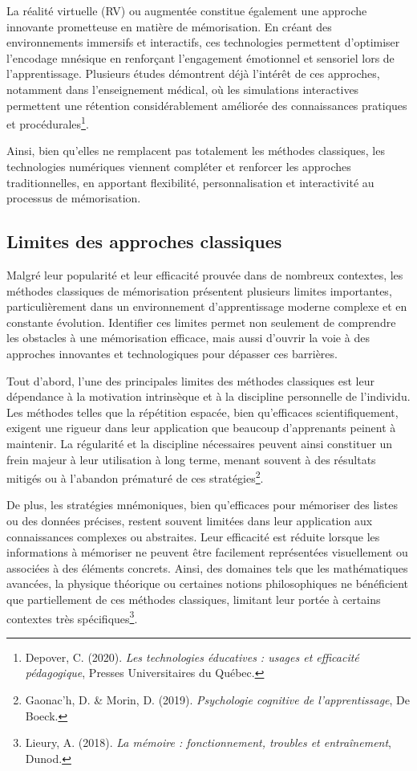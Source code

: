 \documentclass[12pt,a4paper]{report}
\begin{document}
La réalité virtuelle (RV) ou augmentée constitue également une approche innovante prometteuse en matière de mémorisation. En créant des environnements immersifs et interactifs, ces technologies permettent d'optimiser l'encodage mnésique en renforçant l'engagement émotionnel et sensoriel lors de l’apprentissage. Plusieurs études démontrent déjà l’intérêt de ces approches, notamment dans l’enseignement médical, où les simulations interactives permettent une rétention considérablement améliorée des connaissances pratiques et procédurales\footnote{Depover, C. (2020). \textit{Les technologies éducatives : usages et efficacité pédagogique}, Presses Universitaires du Québec.}.

Ainsi, bien qu’elles ne remplacent pas totalement les méthodes classiques, les technologies numériques viennent compléter et renforcer les approches traditionnelles, en apportant flexibilité, personnalisation et interactivité au processus de mémorisation.

\subsection{Limites des approches classiques}

Malgré leur popularité et leur efficacité prouvée dans de nombreux contextes, les méthodes classiques de mémorisation présentent plusieurs limites importantes, particulièrement dans un environnement d’apprentissage moderne complexe et en constante évolution. Identifier ces limites permet non seulement de comprendre les obstacles à une mémorisation efficace, mais aussi d’ouvrir la voie à des approches innovantes et technologiques pour dépasser ces barrières.

Tout d’abord, l’une des principales limites des méthodes classiques est leur dépendance à la motivation intrinsèque et à la discipline personnelle de l’individu. Les méthodes telles que la répétition espacée, bien qu’efficaces scientifiquement, exigent une rigueur dans leur application que beaucoup d’apprenants peinent à maintenir. La régularité et la discipline nécessaires peuvent ainsi constituer un frein majeur à leur utilisation à long terme, menant souvent à des résultats mitigés ou à l’abandon prématuré de ces stratégies\footnote{Gaonac'h, D. \& Morin, D. (2019). \textit{Psychologie cognitive de l'apprentissage}, De Boeck.}.

De plus, les stratégies mnémoniques, bien qu’efficaces pour mémoriser des listes ou des données précises, restent souvent limitées dans leur application aux connaissances complexes ou abstraites. Leur efficacité est réduite lorsque les informations à mémoriser ne peuvent être facilement représentées visuellement ou associées à des éléments concrets. Ainsi, des domaines tels que les mathématiques avancées, la physique théorique ou certaines notions philosophiques ne bénéficient que partiellement de ces méthodes classiques, limitant leur portée à certains contextes très spécifiques\footnote{Lieury, A. (2018). \textit{La mémoire : fonctionnement, troubles et entraînement}, Dunod.}.
\end{document}
